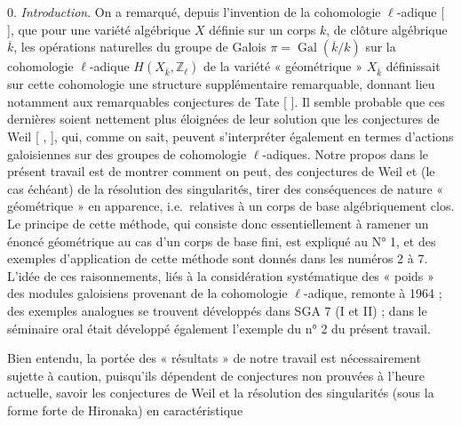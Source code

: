 \documentclass[11pt,a4paper]{article}
\begin{document}
0. \emph{Introduction}. On a remarqué, depuis 
l'invention de la cohomologie $\ell$-adique [ ], que pour une variété
algébrique $X$ définie sur un corps $k$, de clôture algébrique $\overline{k}$,
les opérations naturelles du groupe de Galois $\pi = \operatorname{Gal}(\overline{k}/k)$
sur la cohomologie $\ell$-adique $H(X_{\overline{k}}, \mathbb{Z}_{\ell})$ de la
variété « géométrique » $X_{\overline{k}}$ définissait sur cette
 cohomologie une structure supplémentaire remarquable,
donnant lieu notamment aux remarquables conjectures de Tate [ ]. Il semble
probable que ces dernières soient nettement plus éloignées de
 leur solution que les conjectures de Weil [ , ], qui, comme
on sait, peuvent s'interpréter également en termes d'actions galoisiennes sur
des groupes de cohomologie $\ell$-adiques. Notre propos dans le présent
travail est de montrer comment on peut, des conjectures de Weil et (le cas
échéant) de la résolution des singularités, tirer des conséquences de nature
« géométrique » en apparence, i.e.\ relatives à un corps de base
algébriquement clos. Le principe de cette méthode, qui consiste donc
essentiellement à ramener un énoncé géométrique au cas d'un corps de base
fini, est expliqué au N° 1, et des exemples d'application de cette méthode
sont donnés dans les numéros 2 à 7. L'idée de ces raisonnements, liés à
la considération systématique des « poids » des modules galoisiens
provenant de la cohomologie $\ell$-adique, remonte à 1964 ; des exemples
analogues  se trouvent développés dans SGA 7 (I
et II) ; dans le séminaire oral était développé également l'exemple du
n° 2 du présent travail.

Bien entendu, la portée des « résultats » de notre travail est
nécessairement  sujette à caution, puisqu'ils
dépendent de conjectures non prouvées à l'heure actuelle, savoir les
conjectures de Weil et la résolution des singularités (sous la forme forte de
Hironaka) en caractéristique
\end{document}
